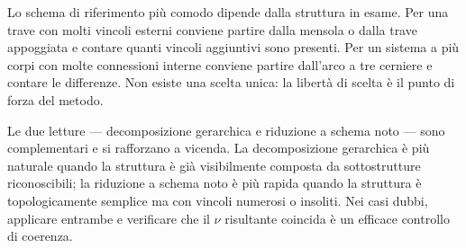 	Lo schema di riferimento più comodo dipende dalla
	struttura in esame. Per una trave con molti vincoli
	esterni conviene partire dalla mensola o dalla trave
	appoggiata e contare quanti vincoli aggiuntivi sono
	presenti. Per un sistema a più corpi con molte
	connessioni interne conviene partire dall'arco a
	tre cerniere e contare le differenze. Non esiste
	una scelta unica: la libertà di scelta è il punto
	di forza del metodo.

	Le due letture --- decomposizione gerarchica e
	riduzione a schema noto --- sono complementari e
	si rafforzano a vicenda. La decomposizione gerarchica
	è più naturale quando la struttura è già visibilmente
	composta da sottostrutture riconoscibili; la riduzione
	a schema noto è più rapida quando la struttura è
	topologicamente semplice ma con vincoli numerosi o
	insoliti. Nei casi dubbi, applicare entrambe e
	verificare che il $\nu$ risultante coincida è un
	efficace controllo di coerenza.



